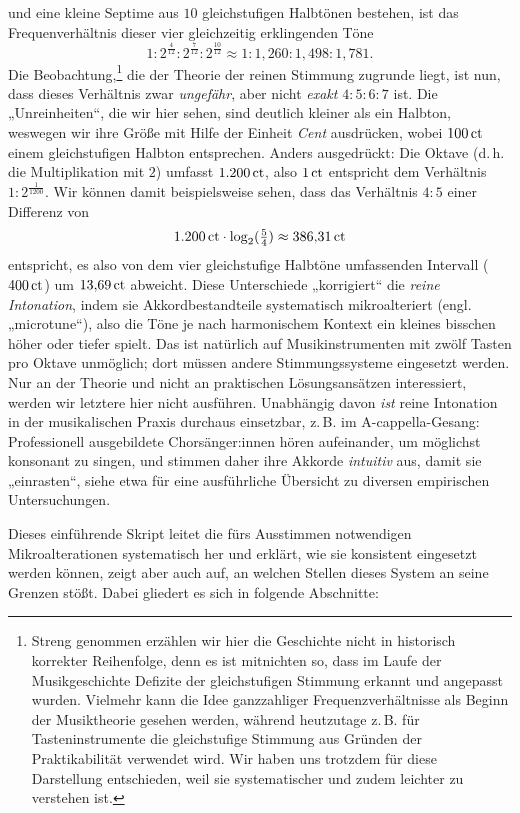 und eine kleine Septime aus $10$ gleichstufigen Halbtönen bestehen, ist das
Frequenverhältnis dieser vier gleichzeitig erklingenden Töne %
\[1:2^{\frac4{12}}:2^{\frac7{12}}:2^{\frac{10}{12}}\approx
  1:1{,}260:1{,}498:1{,}781.\]%
Die Beobachtung,\footnote{Streng genommen erzählen wir hier die Geschichte nicht
  in historisch korrekter Reihenfolge, denn es ist mitnichten so, dass im Laufe
  der Musikgeschichte Defizite der gleichstufigen Stimmung erkannt und angepasst
  wurden. Vielmehr kann die Idee ganzzahliger Frequenzverhältnisse als Beginn
  der Musiktheorie gesehen werden, während heutzutage z.\,B. für
  Tasteninstrumente die gleichstufige Stimmung aus Gründen der Praktikabilität
  verwendet wird. Wir haben uns trotzdem für diese Darstellung entschieden, weil
  sie systematischer und zudem leichter zu verstehen ist.} die der
Theorie der reinen Stimmung zugrunde liegt, ist nun, dass dieses Verhältnis zwar
\emph{ungefähr}, aber nicht \emph{exakt} $4:5:6:7$ ist. Die „Unreinheiten“, die
wir hier sehen, sind deutlich kleiner als ein Halbton, weswegen wir ihre Größe
mit Hilfe der Einheit \emph{Cent} ausdrücken, wobei $100\,\text{ct}$ einem
gleichstufigen Halbton entsprechen. Anders ausgedrückt: Die Oktave (d.\,h. die
Multiplikation mit $2$) umfasst $1{.}200\,\text{ct}$, also $1\,\text{ct}$ entspricht dem
Verhältnis $1:2^{\frac1{1200}}$. Wir können damit bei\-spielsweise sehen, dass
das Verhältnis $4:5$ einer Differenz von
\[1{.}200\,\text{ct}\cdot \log_2(\tfrac54) \approx 386{,}31\,\text{ct}\]%
entspricht, es also von dem vier gleichstufige Halbtöne umfassenden Intervall
($400\,\text{ct}$) um $13{,}69\,\text{ct}$ abweicht. Diese Unterschiede „korrigiert“ die
\emph{reine Intonation}, indem sie Akkordbestandteile systematisch
mikroalteriert (engl. „microtune“), also die Töne je nach harmonischem Kontext
ein kleines bisschen höher oder tiefer spielt. Das ist natürlich auf
Musikinstrumenten mit zwölf Tasten pro Oktave unmöglich; dort müssen andere
Stimmungssysteme eingesetzt werden. Nur an der Theorie und nicht an praktischen
Lösungsansätzen interessiert, werden wir letztere hier nicht
ausführen. Unabhängig davon \emph{ist} reine Intonation in der musikalischen
Praxis durchaus einsetzbar, z.\,B. im A-cappella-Gesang: Professionell
ausgebildete Chorsänger:innen hören aufeinander, um möglichst konsonant zu
singen, und stimmen daher ihre Akkorde \emph{intuitiv} aus, damit sie
„einrasten“, siehe etwa \cite[§\,2.4]{Maria} für eine ausführliche Übersicht zu
diversen empirischen Untersuchungen.

Dieses einführende Skript leitet die fürs Ausstimmen notwendigen
Mikroalterationen systematisch her und erklärt, wie sie konsistent eingesetzt
werden können, zeigt aber auch auf, an welchen Stellen dieses System an seine
Grenzen stößt. Dabei gliedert es sich in folgende Abschnitte:

